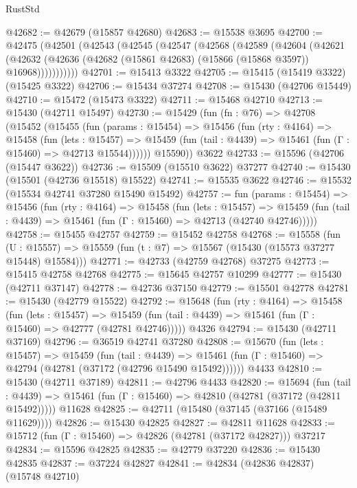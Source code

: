 \begin{lexlean}{RustStd}
\begin{coremodule}
{\begin{coremodule}
{{{{{{{{{{{{{{{{{{{{{{{{{{{{{{{{{{{{{{{{{{{{{{{{{{{{{{{{{{{{@42682 := @42679 (@15857 @42680)
@42683 := @15538 @3695
@42700 := @42475
    (@42501
      (@42543
        (@42545
          (@42547
            (@42568
              (@42589
                (@42604
                  (@42621
                    (@42632
                      (@42636 (@42682 (@15861 @42683) (@15866 (@15868 @3597)) @16968)))))))))))
@42701 := @15413 @3322
@42705 := @15415 (@15419 @3322) (@15425 @3322)
@42706 := @15434 @37274
@42708 := @15430 (@42706 @15449)
@42710 := @15472 (@15473 @3322)
@42711 := @15468 @42710
@42713 := @15430 (@42711 @15497)
@42730 := @15429
    (fun (fn : @76) =>
    @42708
      (@15452
        (@15455
          (fun (params : @15454) =>
          @15456
            (fun (rty : @4164) =>
            @15458
              (fun (lets : @15457) =>
              @15459 (fun (tail : @4439) => @15461 (fun (Γ : @15460) => @42713 @15544))))))
        @15590))
    @3622
@42733 := @15596 (@42706 (@15447 @3622))
@42736 := @15509 (@15510 @3622) @37277
@42740 := @15430 (@15501 (@42736 @15518) @15522)
@42741 := @15535 @3622
@42746 := @15532 (@15534 @42741 @37280 @15490 @15492)
@42757 := fun (params : @15454) =>
  @15456
    (fun (rty : @4164) =>
    @15458
      (fun (lets : @15457) =>
      @15459 (fun (tail : @4439) => @15461 (fun (Γ : @15460) => @42713 (@42740 @42746)))))
@42758 := @15455 @42757
@42759 := @15452 @42758
@42768 := @15558
    (fun (U : @15557) => @15559 (fun (t : @7) => @15567 (@15430 (@15573 @37277 @15448) @15584)))
@42771 := @42733 (@42759 @42768) @37275
@42773 := @15415 @42758 @42768
@42775 := @15645 @42757 @10299
@42777 := @15430 (@42711 @37147)
@42778 := @42736 @37150
@42779 := @15501 @42778
@42781 := @15430 (@42779 @15522)
@42792 := @15648
    (fun (rty : @4164) =>
    @15458
      (fun (lets : @15457) =>
      @15459 (fun (tail : @4439) => @15461 (fun (Γ : @15460) => @42777 (@42781 @42746)))))
    @4326
@42794 := @15430 (@42711 @37169)
@42796 := @36519 @42741 @37280
@42808 := @15670
    (fun (lets : @15457) =>
    @15459
      (fun (tail : @4439) =>
      @15461 (fun (Γ : @15460) => @42794 (@42781 (@37172 (@42796 @15490 @15492))))))
    @4433
@42810 := @15430 (@42711 @37189)
@42811 := @42796 @4433
@42820 := @15694
    (fun (tail : @4439) => @15461 (fun (Γ : @15460) => @42810 (@42781 (@37172 (@42811 @15492)))))
    @11628
@42825 := @42711 (@15480 (@37145 (@37166 (@15489 @11629))))
@42826 := @15430 @42825
@42827 := @42811 @11628
@42833 := @15712 (fun (Γ : @15460) => @42826 (@42781 (@37172 @42827))) @37217
@42834 := @15596 @42825
@42835 := @42779 @37220
@42836 := @15430 @42835
@42837 := @37224 @42827
@42841 := @42834 (@42836 @42837) (@15748 @42710)
}}}}}}}}}}}}}}}}}}}}}}}}}}}}}}}}}}}}}}}}}}}}}}}}}}}}}}}}}}}}
\end{coremodule}}
\end{coremodule}
\end{lexlean}
